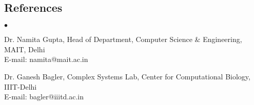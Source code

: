 \documentclass[margin,line]{res}
\newenvironment{list2}{
  \begin{list}{$\bullet$}{%
      \setlength{\itemsep}{0in}
      \setlength{\parsep}{0in} \setlength{\parskip}{0in}
      \setlength{\topsep}{0in} \setlength{\partopsep}{0in}
      \setlength{\leftmargin}{0.2in}}}{\end{list}}
\begin{document}
\begin{resume}
\section{\sc References}
\begin{list2}
\item Dr. Namita Gupta, Head of Department, Computer Science \& Engineering, MAIT, Delhi\\ E-mail: namita@mait.ac.in
\item Dr. Ganesh Bagler, Complex Systems Lab, Center for Computational Biology, IIIT-Delhi\\ E-mail: bagler@iiitd.ac.in
\end{list2}

\end{resume}
\end{document}
